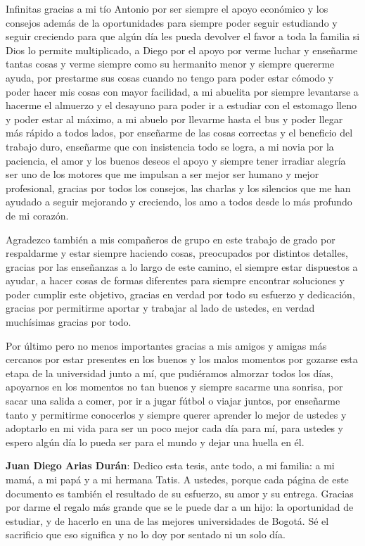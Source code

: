 Infinitas gracias a mi tío Antonio por ser siempre el apoyo económico y los consejos además de la oportunidades para siempre poder seguir estudiando y seguir creciendo para que algún día les pueda devolver el favor a toda la familia si Dios lo permite multiplicado, a Diego por el apoyo por verme luchar y enseñarme tantas cosas y verme siempre como su hermanito menor y siempre quererme ayuda, por prestarme sus cosas cuando no tengo para poder estar cómodo y poder hacer mis cosas con mayor facilidad, a mi abuelita por siempre levantarse a hacerme el almuerzo y el desayuno para poder ir a estudiar con el estomago lleno y poder estar al máximo, a mi abuelo por llevarme hasta el bus y poder llegar más rápido a todos lados, por enseñarme de las cosas correctas y el beneficio del trabajo duro, enseñarme que con insistencia todo se logra, a mi novia por la paciencia, el amor y los buenos deseos el apoyo y siempre tener irradiar alegría ser uno de los motores que me impulsan a ser mejor ser humano y mejor profesional, gracias por todos los consejos, las charlas y los silencios que me han ayudado a seguir mejorando y creciendo, los amo a todos desde lo más profundo de mi corazón.

Agradezco también a mis compañeros de grupo en este trabajo de grado por respaldarme y estar siempre haciendo cosas, preocupados por distintos detalles, gracias por las enseñanzas a lo largo de este camino, el siempre estar dispuestos a ayudar, a hacer cosas de formas diferentes para siempre encontrar soluciones y poder cumplir este objetivo, gracias en verdad por todo su esfuerzo y dedicación, gracias por permitirme aportar y trabajar al lado de ustedes, en verdad muchísimas gracias por todo. 

Por último pero no menos importantes gracias a mis amigos y amigas más cercanos por estar presentes en los buenos y los malos momentos por gozarse esta etapa de la universidad junto a mí, que pudiéramos almorzar todos los días, apoyarnos en los momentos no tan buenos y siempre sacarme una sonrisa, por sacar una salida a comer, por ir a jugar fútbol o viajar juntos, por enseñarme tanto y permitirme conocerlos y siempre querer aprender lo mejor de ustedes y adoptarlo en mi vida para ser un poco mejor cada día para mí, para ustedes y espero algún día lo pueda ser para el mundo y dejar una huella en él.

\textbf{Juan Diego Arias Durán}: Dedico esta tesis, ante todo, a mi familia: a mi mamá, a mi papá y a mi
hermana Tatis. A ustedes, porque cada página de este documento es también el resultado de su esfuerzo, su
amor y su entrega. Gracias por darme el regalo más grande que se le puede dar a un hijo: la oportunidad de
estudiar, y de hacerlo en una de las mejores universidades de Bogotá. Sé el sacrificio que eso significa y
no lo doy por sentado ni un solo día.

